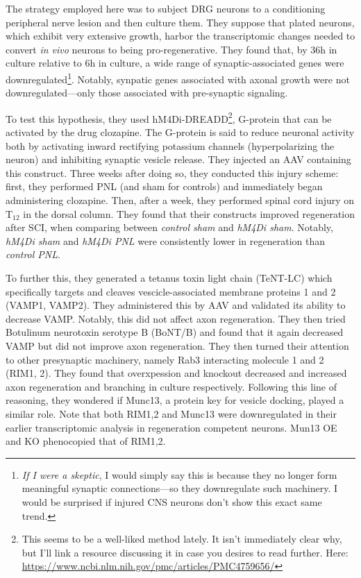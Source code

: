 The strategy employed here was to subject DRG neurons to a conditioning peripheral nerve lesion and then culture them. They suppose that plated neurons, which exhibit very extensive growth, harbor the transcriptomic changes needed to convert \textit{in vivo} neurons to being pro-regenerative. They found that, by 36h in culture relative to 6h in culture, a wide range of synaptic-associated genes were downregulated\footnote{\textit{If I were a skeptic}, I would simply say this is because they no longer form meaningful synaptic connections---so they downregulate such machinery. I would be surprised if injured CNS neurons don't show this exact same trend.}. Notably, synpatic genes associated with axonal growth were not downregulated---only those associated with pre-synaptic signaling.\newline

To test this hypothesis, they used hM4Di-DREADD\footnote{This seems to be a well-liked method lately. It isn't immediately clear why, but I'll link a resource discussing it in case you desires to read further. Here: \url{https://www.ncbi.nlm.nih.gov/pmc/articles/PMC4759656/}}, G-protein that can be activated by the drug clozapine. The G-protein is said to reduce neuronal activity both by activating inward rectifying potassium channels (hyperpolarizing the neuron) and inhibiting synaptic vesicle release. They injected an AAV containing this construct. Three weeks after doing so, they conducted this injury scheme: first, they performed PNL (and sham for controls) and immediately began administering clozapine. Then, after a week, they performed spinal cord injury on T$_{12}$ in the dorsal column. They found that their constructs improved regeneration after SCI, when comparing between \textit{control sham} and \textit{hM4Di sham}. Notably, \textit{hM4Di sham} and \textit{hM4Di PNL} were consistently lower in regeneration than \textit{control PNL}.\newline

To further this, they generated a tetanus toxin light chain (TeNT-LC) which specifically targets and cleaves vescicle-associated membrane proteins 1 and 2 (VAMP1, VAMP2). They administered this by AAV and validated its ability to decrease VAMP. Notably, this did not affect axon regeneration. They then tried Botulinum neurotoxin serotype B (BoNT/B) and found that it again decreased VAMP but did not improve axon regeneration. They then turned their attention to other presynaptic machinery, namely Rab3 interacting molecule 1 and 2 (RIM1, 2). They found that overxpession and knockout decreased and increased axon regeneration and branching in culture respectively. Following this line of reasoning, they wondered if Munc13, a protein key for vesicle docking, played a similar role. Note that both RIM1,2 and Munc13 were downregulated in their earlier transcriptomic analysis in regeneration competent neurons. Mun13 OE and KO phenocopied that of RIM1,2.\newline

